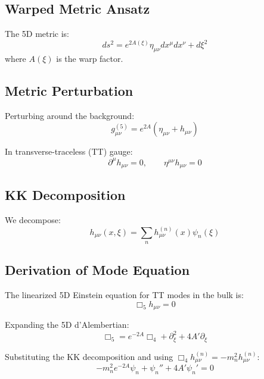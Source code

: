 \documentclass[11pt,a4paper]{article}
\begin{document}
\subsection{Warped Metric Ansatz}

The 5D metric is:
\begin{equation}
ds^2 = e^{2A(\xi)} \eta_{\mu\nu} dx^\mu dx^\nu + d\xi^2
\label{eq:metric}
\end{equation}
where $A(\xi)$ is the warp factor.

\subsection{Metric Perturbation}

Perturbing around the background:
\begin{equation}
g_{\mu\nu}^{(5)} = e^{2A}(\eta_{\mu\nu} + h_{\mu\nu})
\label{eq:pert-metric}
\end{equation}

In transverse-traceless (TT) gauge:
\begin{equation}
\partial^\mu h_{\mu\nu} = 0, \qquad \eta^{\mu\nu} h_{\mu\nu} = 0
\label{eq:TT-gauge}
\end{equation}

\subsection{KK Decomposition}

We decompose:
\begin{equation}
h_{\mu\nu}(x,\xi) = \sum_n h_{\mu\nu}^{(n)}(x) \psi_n(\xi)
\label{eq:KK-decomp}
\end{equation}

\subsection{Derivation of Mode Equation}

The linearized 5D Einstein equation for TT modes in the bulk is:
\begin{equation}
\Box_5 h_{\mu\nu} = 0
\label{eq:5D-EOM}
\end{equation}

Expanding the 5D d'Alembertian:
\begin{equation}
\Box_5 = e^{-2A} \Box_4 + \partial_\xi^2 + 4A' \partial_\xi
\label{eq:Box5}
\end{equation}

Substituting the KK decomposition and using $\Box_4 h^{(n)}_{\mu\nu} = -m_n^2 h^{(n)}_{\mu\nu}$:
\begin{equation}
-m_n^2 e^{-2A} \psi_n + \psi_n'' + 4A' \psi_n' = 0
\label{eq:mode-eq-derivation}
\end{equation}
\end{document}
